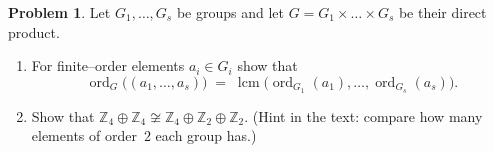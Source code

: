 \documentclass[12pt]{article}
\DeclareMathOperator{\lcm}{lcm}
\DeclareMathOperator{\ord}{ord}
\theoremstyle{definition} %
\newtheorem{problem}{Problem}
\theoremstyle{plain} %
\begin{document}
\begin{problem}
  Let $G_1,\dots,G_s$ be groups and let $G=G_1\times\dots\times G_s$ be
  their direct product.
  \begin{enumerate}[label=\textbf{(\alph*)}]
    \item For finite–order elements $a_i\in G_i$ show that
          \[
            \ord_G\bigl((a_1,\dots,a_s)\bigr)
            \;=\;
            \lcm\bigl(\ord_{G_1}(a_1),\dots,\ord_{G_s}(a_s)\bigr).
          \]
    \item Show that
          \(
            \mathbb Z_4\oplus\mathbb Z_4
            \not\cong
            \mathbb Z_4\oplus\mathbb Z_2\oplus\mathbb Z_2.
          \)
          (Hint in the text: compare how many elements of order \(2\) each
          group has.)
  \end{enumerate}
\end{problem}
\end{document}
